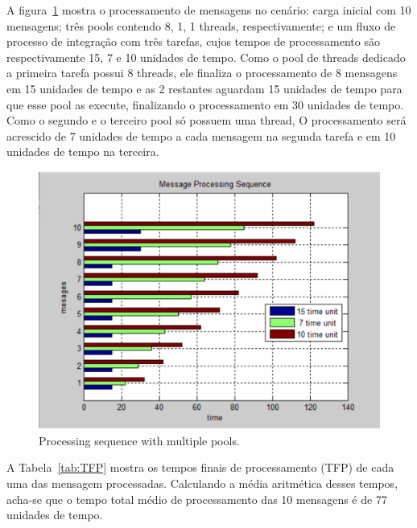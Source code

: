 A figura~\ref{fig:graphic_sequence_multiple} mostra o processamento de mensagens no cenário: carga inicial com 10 mensagens; três pools contendo 8, 1, 1 threads, respectivamente; e um fluxo de processo de integração com três tarefas, cujos tempos de processamento são respectivamente 15, 7 e 10 unidades de tempo. Como o pool de threads dedicado a primeira tarefa possui 8 threads, ele finaliza o processamento de 8 mensagens em 15 unidades de tempo e as 2 restantes aguardam 15 unidades de tempo para que esse pool as execute, finalizando o processamento em 30 unidades de tempo. Como o segundo e o terceiro pool só possuem uma thread, O processamento será acrescido de 7 unidades de tempo a cada mensagem na segunda tarefa e em 10 unidades de tempo na terceira. 

\begin{figure}[h]
\centering
 \includegraphics[width=1\linewidth]{./figs/graphic_sequence_multiple.eps}
 \caption{Processing sequence with multiple pools.}
\label{fig:graphic_sequence_multiple}
\end{figure}
%
A Tabela~\ref{tab:TFP} mostra os tempos finais de processamento (TFP) de cada uma das mensagem processadas. Calculando a média aritmética desses tempos, acha-se que o tempo total médio de processamento das 10 mensagens é de 77 unidades de tempo.
%

